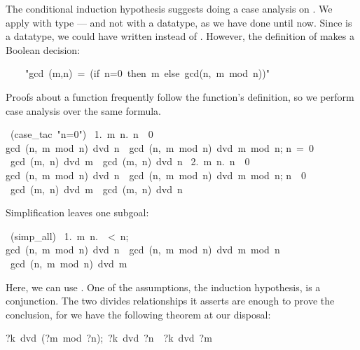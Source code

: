 The conditional induction hypothesis suggests doing a case
analysis on .  We apply  with type
 --- and not with a datatype, as we have done until now.  Since
 is a datatype, we could have written
 instead of .  However, the definition
of  makes a Boolean decision:
\begin{isabelle}
\ \ \ \ "gcd\ (m,n)\ =\ (if\ n=0\ then\ m\ else\ gcd(n,\ m\ mod\ n))"
\end{isabelle}
Proofs about a function frequently follow the function's definition, so we perform
case analysis over the same formula.
\begin{isabelle}
\ (case_tac\ "n=0")\isanewline
\ 1.\ \isasymAnd m\ n.\ \isasymlbrakk n\ \isasymnoteq \ 0\ \isasymlongrightarrow \isanewline
{}gcd\ (n,\ m\ mod\ n)\ dvd\ n\ \isasymand \ gcd\ (n,\ m\ mod\ n)\ dvd\ m\ mod\ n;\isanewline
{}n\ =\ 0\isasymrbrakk \isanewline
{}\isasymLongrightarrow \ gcd\ (m,\ n)\ dvd\ m\ \isasymand \ gcd\ (m,\ n)\ dvd\ n\isanewline
\ 2.\ \isasymAnd m\ n.\ \isasymlbrakk n\ \isasymnoteq \ 0\ \isasymlongrightarrow \isanewline
{}gcd\ (n,\ m\ mod\ n)\ dvd\ n\ \isasymand \ gcd\ (n,\ m\ mod\ n)\ dvd\ m\ mod\ n;\isanewline
{}n\ \isasymnoteq \ 0\isasymrbrakk
\isanewline
{}\isasymLongrightarrow \ gcd\ (m,\ n)\ dvd\ m\ \isasymand \ gcd\ (m,\ n)\ dvd\ n%
\end{isabelle}
%
Simplification leaves one subgoal: 
\begin{isabelle}
\ (simp_all)\isanewline
\ 1.\ \isasymAnd m\ n.\ \ <\ n;\isanewline
{}gcd\ (n,\ m\ mod\ n)\ dvd\ n\
\isasymand \ gcd\ (n,\ m\ mod\ n)\ dvd\ m\ mod\
n\isasymrbrakk \isanewline
\isaindent{\ 1.\ \isasymAnd m\ n.\ }\isasymLongrightarrow \ gcd\ (n,\ m\ mod\ n)\ dvd\ m%
\end{isabelle}
%
Here, we can use .  
One of the assumptions, the induction hypothesis, is a conjunction. 
The two divides relationships it asserts are enough to prove 
the conclusion, for we have the following theorem at our disposal: 
\begin{isabelle}
\isasymlbrakk?k\ dvd\ (?m\ mod\ ?n){;}\ ?k\ dvd\ ?n\isasymrbrakk\ \isasymLongrightarrow\ ?k\ dvd\ ?m%
\end{isabelle}
